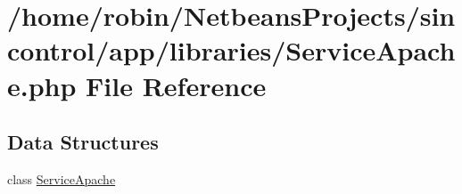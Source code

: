 \hypertarget{app_2libraries_2_service_apache_8php}{}\section{/home/robin/\+Netbeans\+Projects/sincontrol/app/libraries/\+Service\+Apache.php File Reference}
\label{app_2libraries_2_service_apache_8php}
\subsection*{Data Structures}
\begin{DoxyCompactItemize}
\item 
class \hyperlink{class_service_apache}{Service\+Apache}
\end{DoxyCompactItemize}
